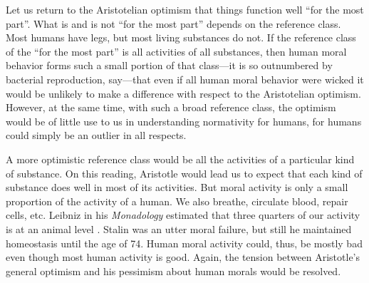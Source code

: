 Let us return to the Aristotelian optimism that things function well ``for the most part''. What is and is not
``for the most part'' depends on the reference class. Most humans have legs, but most living substances do not. 
If the reference class of the ``for the most part'' is all activities of all substances, then human moral behavior
forms such a small portion of that class---it is so outnumbered by bacterial reproduction, say---that even if 
all human moral behavior were wicked it would be unlikely to make a difference with respect to the Aristotelian
optimism. However, at the same time, with such a broad reference class, the optimism would be of little use to us
in understanding normativity for humans, for humans could simply be an outlier in all respects. 

A more optimistic reference class would be all the activities of a particular kind of substance. On this reading, 
Aristotle would lead us to expect that each kind of substance does well in most of its activities. But moral activity
is only a small proportion of the activity of a human. We also breathe, circulate blood, repair cells, etc. Leibniz 
in his \textit{Monadology} estimated that three quarters of our activity is at an animal level \parencite[Sect.~28]{RescherMonadology}. Stalin was an utter moral failure, but
still he maintained homeostasis until the age of 74. Human moral activity could, thus, be mostly bad even though most
human activity is good. Again, the tension between Aristotle's general optimism and his pessimism about human morals
would be resolved.

